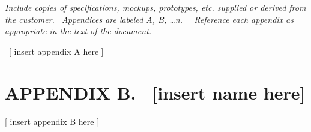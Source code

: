 \documentclass[twoside,letterpaper]{article}
\begin{document}
\bigskip

{\itshape\color{black}
Include copies of specifications, mockups, prototypes, etc. supplied or
derived from the customer. \ Appendices are labeled A, B, {\dots}n.
\ \ Reference each appendix as appropriate in the text of the document.
}

{\color{black}
\foreignlanguage{english}{\ }\foreignlanguage{english}{[ insert appendix
A here ]}}

\clearpage\setcounter{page}{1}\pagestyle{Convertviii}
\section[APPENDIX B. \ [insert name
here{]}]{\rmfamily\bfseries\color{black}
APPENDIX B. \ [insert name here]}

\bigskip

{\color{black}
[ insert appendix B here ]}


\bigskip
\end{document}
